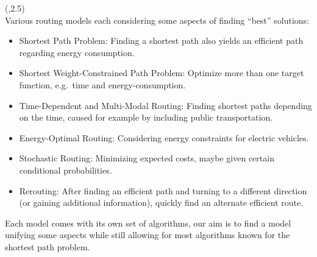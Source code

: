 \begin{textblock}{\mycolwidth}(\leftpos,2.5)
 \\
\large
Various routing models each considering some aspects of finding ``best''
solutions:
\begin{itemize}
  \item Shortest Path Problem: Finding a shortest path also yields an efficient path regarding energy consumption.
  \item Shortest Weight-Constrained Path Problem: Optimize more than one target function, e.g.\ time and energy-consumption.
  \item Time-Dependent and Multi-Modal Routing: Finding shortest paths depending on the time, caused for example by including public transportation.
  \item Energy-Optimal Routing: Considering energy constraints for electric vehicles.
  \item Stochastic Routing: Minimizing expected costs, maybe given certain conditional probabilities.
  \item Rerouting: After finding an efficient path and turning to a different direction (or gaining additional information),
  quickly find an alternate efficient route.
\end{itemize}
Each model comes with its own set of algorithms,
our aim is to find a model unifying some aspects while still
allowing for most algorithms known for the shortest path problem.
\end{textblock}

